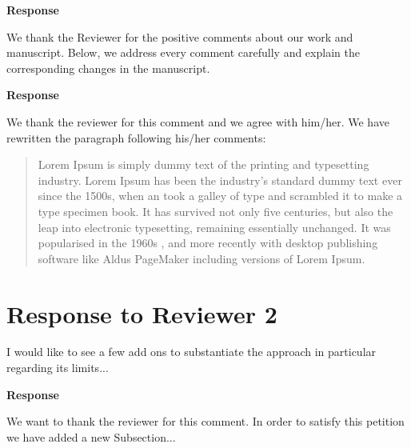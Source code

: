 \documentclass[a4paper,twoside,11pt]{reviewresponse}
\begin{document}
\textbf{Response}

We thank the Reviewer for the positive comments about our work and manuscript. Below, we address every comment carefully and explain the corresponding changes in the manuscript.


\textbf{Response}

We thank the reviewer for this comment and we agree with him/her. We have rewritten the paragraph following his/her comments:  

\begin{quotation}\noindent
Lorem Ipsum is simply dummy text of the printing and typesetting industry. Lorem Ipsum has been the industry's standard dummy text ever since the 1500s, when an  took a galley of type and scrambled it to make a type specimen book. It has survived not only five centuries, but also the leap into electronic typesetting, remaining essentially unchanged. It was popularised in the 1960s , and more recently with desktop publishing software like Aldus PageMaker including versions of Lorem Ipsum.
\end{quotation} 

\clearpage

\section{Response to Reviewer 2}

\rcomment
{
I would like to see a few add ons to substantiate the approach in particular regarding its limits...
}

\textbf{Response}

We want to thank the reviewer for this comment. In order to satisfy this petition we have added a new Subsection...


\end{document}
